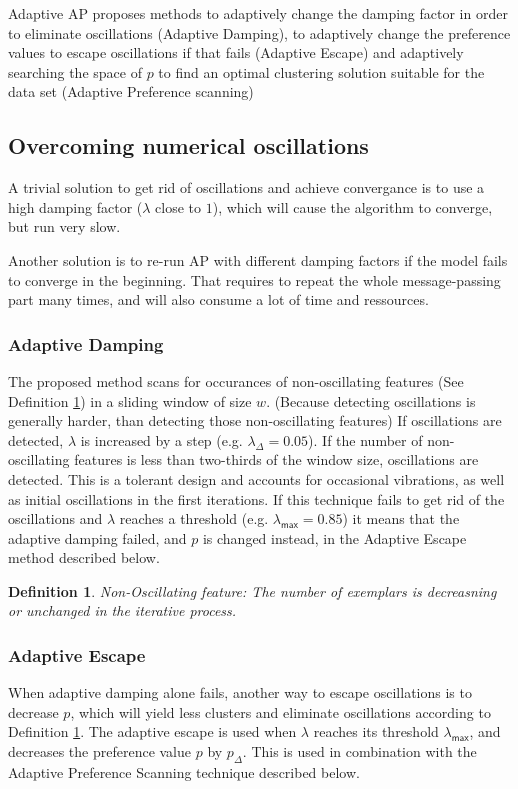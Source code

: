 \documentclass[11pt,a4paper]{article}
\newtheorem{definition}{Definition}
\begin{document}
Adaptive AP proposes methods to adaptively change the damping factor in order to eliminate oscillations (Adaptive Damping), to adaptively change the preference values to escape oscillations if that fails (Adaptive Escape) and adaptively searching the space of $p$ to find an optimal clustering solution suitable for the data set (Adaptive Preference scanning)
\subsection{Overcoming numerical oscillations}
A trivial solution to get rid of oscillations and achieve convergance is to use a high damping factor ($\lambda$ close to $1$), which will cause the algorithm to converge, but run very slow.\cite{wang2008adaptive}

Another solution is to re-run AP with different damping factors if the model fails to converge in the beginning. That requires to repeat the whole message-passing part many times, and will also consume a lot of time and ressources.\cite{wang2008adaptive}

\subsubsection{Adaptive Damping}
The proposed method scans for occurances of non-oscillating features (See Definition \ref{def:nonosc}) in a sliding window of size $w$. (Because detecting oscillations is generally harder, than detecting those non-oscillating features) If oscillations are detected, $\lambda$ is increased by a step (e.g. $\lambda_\Delta = 0.05$). If the number of non-oscillating features is less than two-thirds of the window size, oscillations are detected. This is a tolerant design and accounts for occasional vibrations, as well as initial oscillations in the first iterations.\cite{wang2008adaptive} If this technique fails to get rid of the oscillations and $\lambda$ reaches a threshold (e.g. $\lambda_{\mathsf{max}} = 0.85$) it means that the adaptive damping failed, and $p$ is changed instead, in the Adaptive Escape method described below.
\begin{definition}\label{def:nonosc}
	Non-Oscillating feature: The number of exemplars is decreasning or unchanged in the iterative process.\cite{wang2008adaptive}
\end{definition}
\subsubsection{Adaptive Escape}
When adaptive damping alone fails, another way to escape oscillations is to decrease $p$, which will yield less clusters and eliminate oscillations according to Definition \ref{def:nonosc}. The adaptive escape is used when $\lambda$ reaches its threshold $\lambda_{\mathsf{max}}$, and decreases the preference value $p$ by $p_{\Delta}$.\cite{wang2008adaptive} This is used in combination with the Adaptive Preference Scanning technique described below.
\end{document}
